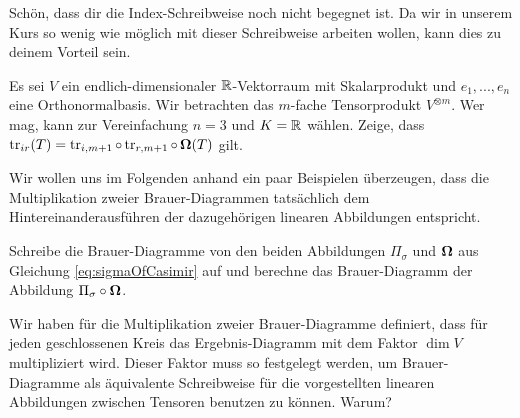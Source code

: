 \begin{sheet}
\begin{problem}[title={Was denn für Indizes?}]
	Schön, dass dir die Index-Schreibweise noch nicht begegnet ist. Da wir in unserem Kurs so wenig wie möglich mit dieser Schreibweise arbeiten wollen, kann dies zu deinem Vorteil sein.

	Es sei $V$ ein endlich-dimensionaler $\mathbb{R}$-Vektorraum mit Skalarprodukt und $e_1, ..., e_n$ eine Orthonormalbasis. Wir betrachten das $m$-fache Tensorprodukt $V^{\otimes m}$. Wer mag, kann zur Vereinfachung $n=3$ und $K=\mathbb{R}$ wählen. Zeige, dass $\operatorname{tr}_{ir}(T)=\operatorname{tr}_{i,m+1}\circ\operatorname{tr}_{r,m+1}\circ\operatorname{\mathbf{\Omega}}(T)$ gilt.

\end{problem}

\begin{problem}[title={Brauer-Diagramme}]
	Wir wollen uns im Folgenden anhand ein paar Beispielen überzeugen, dass die Multiplikation zweier Brauer-Diagrammen tatsächlich dem Hintereinanderausführen der dazugehörigen linearen Abbildungen entspricht.
	\begin{subproblem}
		Schreibe die Brauer-Diagramme von den beiden Abbildungen $\Pi_\sigma$ und $\operatorname{\mathbf{\Omega}}$ aus Gleichung \ref{eq:sigmaOfCasimir} auf und berechne das Brauer-Diagramm der  Abbildung $\Pi_\sigma \circ\operatorname{\mathbf{\Omega}}$.
	\end{subproblem}
	\begin{subproblem}
		Wir haben für die Multiplikation zweier Brauer-Diagramme definiert, dass für jeden geschlossenen Kreis das Ergebnis-Diagramm mit dem Faktor $\dim{V}$ multipliziert wird. Dieser Faktor muss so festgelegt werden, um Brauer-Diagramme als äquivalente Schreibweise für die vorgestellten linearen Abbildungen zwischen Tensoren benutzen zu können. Warum?
		

\end{subproblem}
\end{problem}
\end{sheet}

